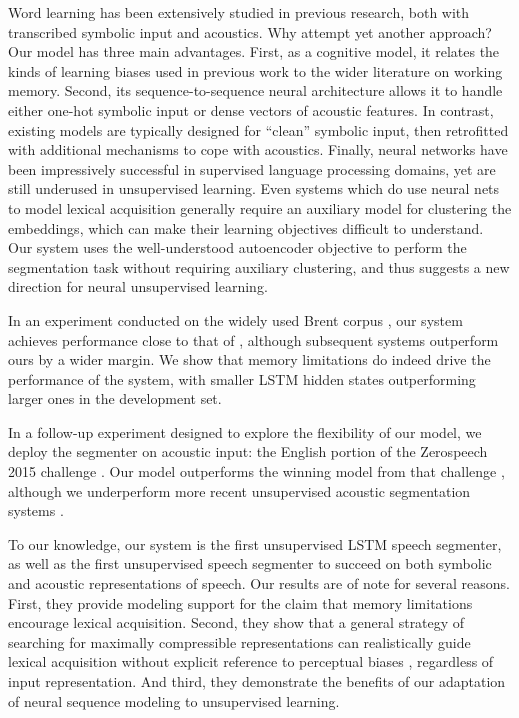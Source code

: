 \documentclass[11pt,letterpaper]{article}
\begin{document}
Word learning has been extensively studied in previous research, both
with transcribed symbolic input and acoustics. Why attempt yet another
approach? Our model has three main advantages. First, as a cognitive
model, it relates the kinds of learning biases used in previous work
to the wider literature on working memory. Second, its
sequence-to-sequence neural architecture allows it to handle either
one-hot symbolic input or dense vectors of acoustic features. In
contrast, existing models are typically designed for ``clean''
symbolic input, then retrofitted with additional mechanisms to cope
with acoustics. Finally, neural networks have been impressively
successful in supervised language processing domains, yet are still
underused in unsupervised learning. Even systems which do use neural
nets to model lexical acquisition generally require an auxiliary model
for clustering the embeddings, which can make their learning
objectives difficult to understand. Our system uses the
well-understood autoencoder objective to perform the segmentation task
without requiring auxiliary clustering, and thus suggests a new
direction for neural unsupervised learning.

In an experiment conducted on the widely used Brent corpus \cite{Brent99}, our system achieves performance close to that of , although subsequent systems outperform ours by a wider margin. 
We show that memory limitations do indeed drive the performance of the system, with smaller LSTM hidden states outperforming larger ones in the development set.

In a follow-up experiment designed to explore the flexibility of our model, we deploy the segmenter on acoustic input: the English portion of the Zerospeech 2015 challenge \cite{Versteegh15}.
Our model outperforms the winning model from that challenge \cite{Rasanen15}, although we underperform more recent unsupervised acoustic segmentation systems \cite{Kamper16,RasanenND}.

To our knowledge, our system is the first unsupervised LSTM speech segmenter, as well as the first unsupervised speech segmenter to succeed on both symbolic and acoustic representations of speech.
Our results are of note for several reasons.
First, they provide modeling support for the claim that memory limitations encourage lexical acquisition.
Second, they show that a general strategy of searching for maximally compressible representations can realistically guide lexical acquisition without explicit reference to perceptual biases \cite[c.f.\ e.g.][]{Rasanen15}, regardless of input representation.
And third, they demonstrate the benefits of our adaptation of neural sequence modeling to unsupervised learning.
\end{document}
